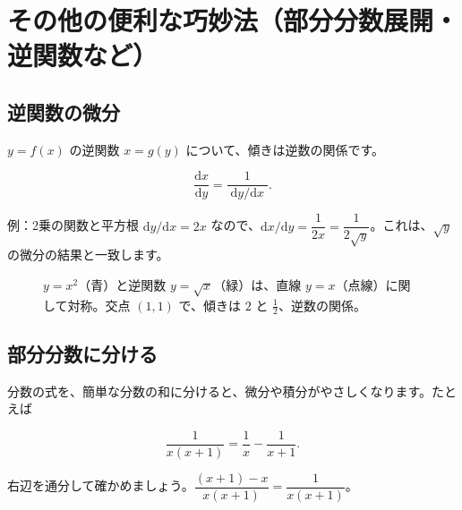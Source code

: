 \documentclass[a4paper,11pt,openany]{ltjsbook}
\newcommand{\dd}{\mathrm{d}}
\begin{document}
\chapter{その他の便利な巧妙法（部分分数展開・逆関数など）}

\section{逆関数の微分}

$y=f(x)$ の逆関数 $x=g(y)$ について、傾きは逆数の関係です。

\[
\frac{\dd x}{\dd y}=\frac{1}{\;\dd y/\dd x\;}.
\]

\begin{examplebox}{例：2乗の関数と平方根}
$\dd y/\dd x=2x$ なので、$\dd x/\dd y=\dfrac1{2x}=\dfrac1{2\sqrt y}$。これは、$\sqrt y$ の微分の結果と一致します。
\end{examplebox}

\begin{figure}[htbp]
\centering
{}
\caption{$y=x^2$（青）と逆関数 $y=\sqrt x$（緑）は、直線 $y=x$（点線）に関して対称。交点 $(1,1)$ で、傾きは $2$ と $\frac12$、逆数の関係。}
\end{figure}

\section{部分分数に分ける}

分数の式を、簡単な分数の和に分けると、微分や積分がやさしくなります。たとえば

\[
\frac{1}{x(x+1)}=\frac1x-\frac1{x+1}.
\]

右辺を通分して確かめましょう。$\dfrac{(x+1)-x}{x(x+1)}=\dfrac1{x(x+1)}$。
\end{document}
